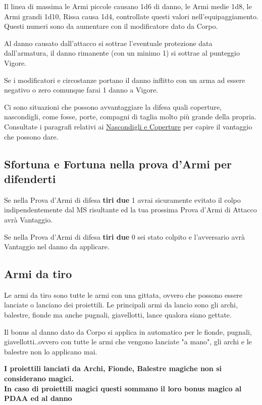 \documentclass[12pt,a4paper,twoside,openany]{book}
\begin{document}
\begin{multicols}{2}
Il linea di massima le Armi piccole causano 1d6 di danno, le Armi medie 1d8, le Armi grandi 1d10, Rissa causa 1d4, controllate questi valori nell'equipaggiamento. Questi numeri sono da aumentare con il modificatore dato da Corpo.

Al danno causato dall'attacco si sottrae l'eventuale protezione data dall'armatura, il danno rimanente (con un minimo 1) si sottrae al punteggio Vigore.

Se i modificatori e circostanze portano il danno inflitto con un arma ad essere negativo o zero comunque farai 1 danno a Vigore.

Ci sono situazioni che possono avvantaggiare la difesa quali coperture, nascondigli, come fosse, porte, compagni di taglia molto più grande della propria. Consultate i paragrafi relativi ai \hyperlink{coperture}{Nascondigli e Coperture} per capire il vantaggio che possono dare.

\subsection{Sfortuna e Fortuna nella prova d'Armi per difenderti}

Se nella Prova d'Armi di difesa \textbf{tiri due} 1 avrai sicuramente evitato il colpo indipendentemente dal MS risultante ed la tua prossima Prova d'Armi di Attacco avrà Vantaggio.

Se nella Prova d'Armi di difesa \textbf{tiri due} 0 sei stato colpito e l'avversario avrà Vantaggio nel danno da applicare.

\subsection{Armi da tiro}\label{armidatiro}

Le armi da tiro sono tutte le armi con una gittata, ovvero che possono essere lanciate o lanciano dei proiettili. Le principali armi da lancio sono gli archi, balestre, fionde ma anche pugnali, giavellotti, lance qualora siano gettate.

Il bonus al danno dato da Corpo si applica in automatico per le fionde, pugnali, giavellotti..ovvero con tutte le armi che vengono lanciate "a mano", gli archi e le balestre non lo applicano mai.

\textbf{I proiettili lanciati da Archi, Fionde, Balestre magiche non si considerano magici.\\
In caso di proiettili magici questi sommano il loro bonus magico al PDAA ed al danno}


\end{multicols}
\end{document}

